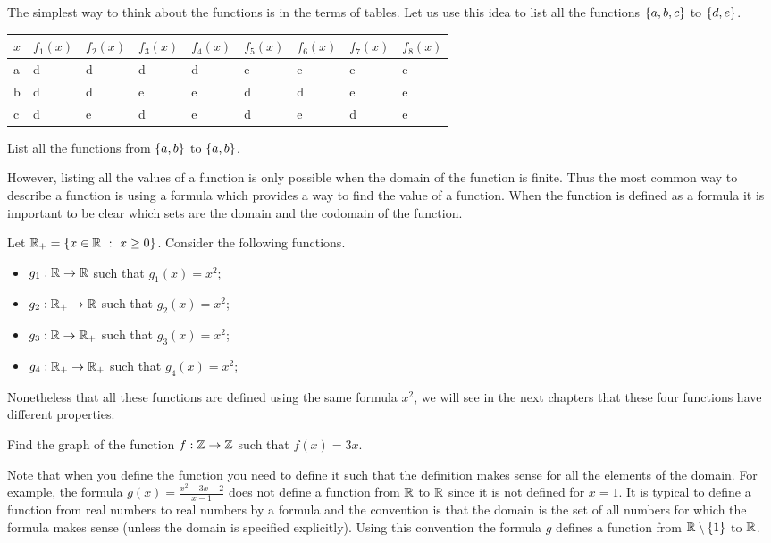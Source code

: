 The simplest way to think about the functions is in the terms of tables.
Let us use this idea to list all the functions $\set{a, b, c}$ to $\set{d, e}$.
\begin{center}
    \begin{tabular}{l l l l l l l l l}
        \toprule
        $x$ & $f_1(x)$ & $f_2(x)$ & $f_3(x)$ & $f_4(x)$ &
        $f_5(x)$ & $f_6(x)$ & $f_7(x)$ & $f_8(x)$ \\
        \midrule
        a & d & d & d & d & e & e & e & e \\
        b & d & d & e & e & d & d & e & e \\
        c & d & e & d & e & d & e & d & e \\
        \bottomrule
    \end{tabular}
\end{center}

\begin{exercise}
    List all the functions from $\set{a, b}$ to $\set{a, b}$.
\end{exercise}

However, listing all the values of a function is only possible when the domain
of the function is finite. Thus the most common way to describe a function is
using a formula which provides a way to find the value of a function. When the
function is defined as a formula it is important to be clear which sets are the
domain and the codomain of the function.

Let $\R_+ = \set[x \ge 0]{x \in \R}$. Consider the following functions.
\begin{itemize}
    \item $g_1 : {\mathbb{R}} \to {\mathbb{R}}$ such that $g_1(x) = x^2$;
    \item $g_2 : {\mathbb{R}}_+ \to {\mathbb{R}}$ such that $g_2(x) = x^2$;
    \item $g_3 : {\mathbb{R}} \to {\mathbb{R}}_+$ such that $g_3(x) = x^2$;
    \item $g_4 : {\mathbb{R}}_+ \to {\mathbb{R}}_+$ such that $g_4(x) = x^2$;
\end{itemize}
Nonetheless that all these functions are defined using the same formula $x^2$,
we will see in the next chapters that these four functions have different
properties.

\begin{exercise}
    Find the graph of the function $f : {\mathbb{Z}} \to {\mathbb{Z}}$ such that $f(x) = 3x$.
\end{exercise}

Note that when you define the function you need to define it such that the
definition makes sense for all the elements of the domain. For example, the
formula $g(x) = \frac{x^2 - 3x + 2}{x - 1}$ does not define a function from
${\mathbb{R}}$ to ${\mathbb{R}}$ since it is not defined for $x = 1$. It is typical to define a
function from real numbers to real numbers by a formula and the convention is
that the domain is the set of all numbers for which the formula makes sense
(unless the domain is specified explicitly).
Using this convention the formula $g$ defines a function from $\R \setminus
\set{1}$ to ${\mathbb{R}}$.

